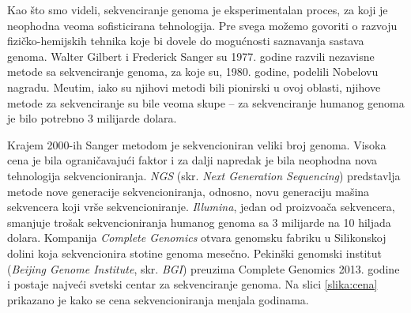 Kao \v sto smo videli, sekvenciranje genoma je eksperimentalan proces, za koji je neophodna veoma sofisticirana tehnologija. Pre svega mo\v zemo govoriti o razvoju fizi\v cko-hemijskih tehnika koje bi dovele do mogu\'cnosti saznavanja sastava genoma. Walter Gilbert i Frederick Sanger su 1977. godine razvili nezavisne metode sa sekvenciranje genoma, za koje su, 1980. godine, podelili Nobelovu nagradu. Me\dj utim, iako su njihovi metodi bili pionirski u ovoj oblasti, njihove metode za sekvenciranje su bile veoma skupe -- za sekvenciranje humanog genoma je bilo potrebno 3 milijarde dolara.

Krajem 2000-ih Sanger metodom je sekvencioniran veliki broj genoma. Visoka cena je bila ograničavajući faktor i za dalji napredak je bila neophodna nova tehnologija sekvencioniranja. \emph{NGS} (skr. \emph{Next Generation Sequencing}) predstavlja metode nove generacije sekvencioniranja, odnosno, novu generaciju ma\v sina sekvencera koji vr\v se sekvencioniranje. \emph{Illumina}, jedan od proizvo\dj a\v ca sekvencera, smanjuje trošak sekvencioniranja humanog genoma sa 3 milijarde na 10 hiljada dolara. Kompanija \emph{Complete Genomics} otvara genomsku fabriku u Silikonskoj dolini koja sekvencionira stotine genoma mesečno. Pekinški genomski institut (\emph{Beijing Genome Institute}, skr. \emph{BGI}) preuzima Complete Genomics 2013. godine i postaje najveći svetski centar za sekvenciranje genoma. Na slici \ref{slika:cena} prikazano je kako se cena sekvencioniranja menjala godinama.

